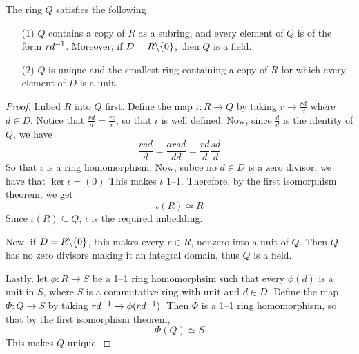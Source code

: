 \begin{corollary}
    The ring $Q$ satisfies the following
    \begin{enumerate}
        \item[(1)] $Q$ contains a copy of $R$ as a subring, and every element of
            $Q$ is of the form $rd^{-1}$. Moreover, if $D=R \backslash \{0\}$, then
            $Q$ is a field.

        \item[(2)] $Q$ is unique and the smallest ring containing a copy of  $R$
            for which every element of  $D$ is a unit.
    \end{enumerate}
\end{corollary}
\begin{proof}
    Imbed $R$ into $Q$ first. Define the map  $\iota:R \xrightarrow{} Q$ by
    taking $r \xrightarrow{} \frac{rd}{d}$ where $d \in D$. Notice that
    $\frac{rd}{d}=\frac{re}{e}$, so that $\iota$ is well defined. Now, since
    $\frac{d}{d}$ is the identity of $Q$, we have
    \begin{equation*}
        \frac{rsd}{d}=\frac{arsd}{dd}=\frac{rd}{d}\frac{sd}{d}
    \end{equation*}
    So that $\iota$ is a ring homomorphism. Now, subce no  $d \in D$ is a zero
    divisor, we have that $\ker{\iota}=(0)$ This makes  $\iota$ 1--1. Therefore,
    by the first isomorphism theorem, we get
    \begin{equation*}
        \iota(R) \simeq R
    \end{equation*}
    Since $\iota(R) \subseteq Q$, $\iota$ is the required imbedding.

    Now, if $D=R \backslash \{0\}$, this makes every $r \in R$, nonzero into a unit
    of  $Q$. Then $Q$ has no zero divisors making it an integral domain, thus
    $Q$ is a field.

    Lastly, let $\phi:R \xrightarrow{} S$ be a 1--1 ring homomorphsim such that
    every $\phi(d)$ is a unit in $S$, where $S$ is a commutative ring with unit
    and $d \in D$. Define the map  $\Phi:Q \xrightarrow{} S$ by taking $rd^{-1}
    \xrightarrow{} \phi(rd^{-1})$. Then $\Phi$ is a 1--1 ring homomorphism, so
    that by the first isomorphism theorem,
     \begin{equation*}
         \Phi(Q) \simeq S
     \end{equation*}
     This makes $Q$ unique.
\end{proof}

